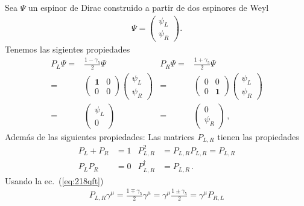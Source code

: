Sea $\Psi$ un espinor de Dirac construido a partir de dos espinores de Weyl
\begin{align}
  \Psi=
  \begin{pmatrix}
   \psi_L\\
    \psi_R
  \end{pmatrix}.
\end{align}
Tenemos las sigientes propiedades
\begin{align}
   P_L \Psi=& \frac{1-\gamma_5}{2}\Psi & P_R \Psi=& \frac{1+\gamma_5}{2}\Psi \nonumber\\
   =&
   \begin{pmatrix}
    \mathbf{1} & 0 \\
     0 & 0
   \end{pmatrix} \begin{pmatrix}
   \psi_L\\
    \psi_R
  \end{pmatrix} & =&\begin{pmatrix}
    0 & 0 \\
     0 & \mathbf{1}
   \end{pmatrix} \begin{pmatrix}
   \psi_L\\
    \psi_R
  \end{pmatrix}\nonumber\\
  =& \begin{pmatrix}
   \psi_L\\
    0
  \end{pmatrix} & =& \begin{pmatrix}
   0\\
    \psi_R
  \end{pmatrix}\,,
\end{align}
Además de las siguientes propiedades:
Las matrices $P_{L,R}$ tienen las propiedades
\begin{align}
  P_L+P_R&=1 & P_{L,R}^2&=P_{L,R}P_{L,R}=P_{L,R}\nonumber\\
  P_L P_R&=0& P_{L,R}^\dagger&=P_{L,R}\,.
\end{align}
Usando la ec.~(\ref{eq:218qft})
\begin{align}
  P_{L,R}\gamma^\mu=\frac{1\mp\gamma_5}{2}\gamma^\mu=\gamma^\mu\frac{1\pm\gamma_5}{2}=\gamma^\mu P_{R,L}
\end{align}

